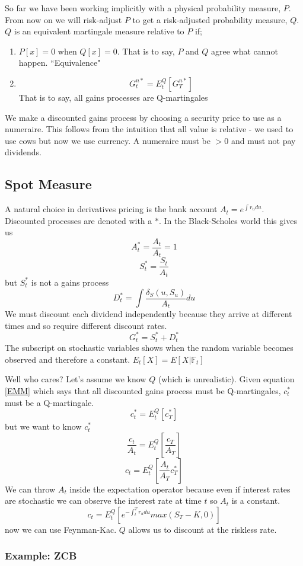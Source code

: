 \documentclass[12pt]{article}
\begin{document}
So far we have been working implicitly with a physical probability measure,
$P$. From now on we will risk-adjust $P$ to get a risk-adjusted probability
measure, $Q$. $Q$ is an equivalent martingale measure relative to $P$ if;
\begin{enumerate}
  \item $P[x]=0$ when $Q[x]=0$. That is to say, $P$ and $Q$ agree what cannot
    happen. ``Equivalence"
  \item \begin{equation} \label{EMM}
      G_t^{n*}=E_t^Q[G_T^{n*}]
    \end{equation}
    That is to say, all gains processes are Q-martingales
\end{enumerate}
We make a discounted gains process by choosing a security price to use as
a numeraire. This follows from the intuition that all value is relative - we
used to use cows but now we use currency. A numeraire must be $> 0$ and must
not pay dividends.

\subsection{Spot Measure}

A natural choice in derivatives pricing is the bank account
$A_t=e^{\int r_udu}$. Discounted processes are denoted with a $*$. In the
Black-Scholes world this gives us
$$A_t^*=\frac{A_t}{A_t}=1$$
$$S_t^*=\frac{S_t}{A_t}$$
but $S_t^*$ is not a gains process
$$D_t^*=\int\frac{\delta_S(u,S_u)}{A_t}du$$
We must discount each dividend independently because they arrive at different
times and so require different discount rates.
$$G_t^*=S_t^*+D_t^*$$
The subscript on stochastic variables shows when the random variable becomes
observed and therefore a constant. $E_t[X]=E[X|\mathbb{F}_t]$

Well who cares? Let's assume we know $Q$ (which is unrealistic). Given equation
\ref{EMM} which says that all discounted gains process must be Q-martingales,
$c_t^*$ must be a Q-martingale.
$$c_t^*=E_t^Q[c_T^*]$$
but we want to know $c_t^*$
$$\frac{c_t}{A_t}=E_t^Q\left[ \frac{c_T}{A_T} \right] $$
$$c_t=E_t^Q\left[ \frac{A_t}{A_T}c_T^* \right] $$
We can throw $A_t$ inside the expectation operator because even if interest
rates are stochastic we can observe the interest rate at time $t$ so $A_t$ is
a constant.
$$c_t=E_t^Q\left[ e^{-\int_t^Tr_udu}max(S_T-K,0) \right] $$
now we can use Feynman-Kac. $Q$ allows us to discount at the riskless rate.

\subsubsection{Example: ZCB}
\end{document}
